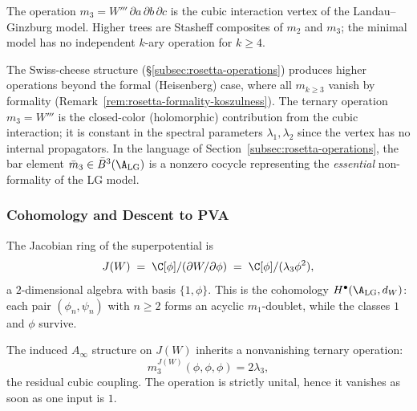 \begin{remark}
\label{rem:lg-m3-physics}
The operation \(m_3=W'''\,\partial a\,\partial b\,\partial c\) is the
cubic interaction vertex of the Landau--Ginzburg model. Higher trees
are Stasheff composites of
\(m_2\) and \(m_3\); the minimal model has no independent \(k\)-ary
operation for \(k\geq4\).
\end{remark}

\begin{remark}
\label{rem:lg-m3-rosetta}
The Swiss-cheese structure (\S\ref{subsec:rosetta-operations}) produces higher operations beyond the formal (Heisenberg) case, where all $m_{k \ge 3}$ vanish by formality (Remark~\ref{rem:rosetta-formality-koszulness}). The ternary operation $m_3 = W'''$ is the closed-color (holomorphic) contribution from the cubic interaction; it is constant in the spectral parameters $\lambda_1,\lambda_2$ since the vertex has no internal propagators. In the language of Section~\ref{subsec:rosetta-operations}, the bar element $\bar{m}_3 \in \bar{B}^3(\A_{\mathrm{LG}})$ is a nonzero cocycle representing the \emph{essential} non-formality of the LG model.
\end{remark}

\subsubsection{Cohomology and Descent to PVA}

\begin{proposition}
\label{prop:LG_cohomology}
The Jacobian ring of the superpotential is
\[
J(W) \;=\; \C[\phi]/(\partial W/\partial\phi)
 \;=\; \C[\phi]/(\lambda_3\phi^2),
\]
a $2$-dimensional algebra with basis $\{1,\phi\}$.
This is the cohomology $H^\bullet(\A_{\mathrm{LG}}, d_W)$: each pair
$(\phi_n,\psi_n)$ with $n \ge 2$ forms an acyclic $m_1$-doublet, while the
classes $1$ and $\phi$ survive.

The induced $A_\infty$ structure on $J(W)$ inherits a nonvanishing ternary
operation:
\begin{equation}\label{eq:lg-jacobian-m3}
 m_3^{J(W)}(\phi,\phi,\phi) = 2\lambda_3,
\end{equation}
the residual cubic coupling. The operation is strictly unital, hence it
vanishes as soon as one input is \(1\).
\end{proposition}

